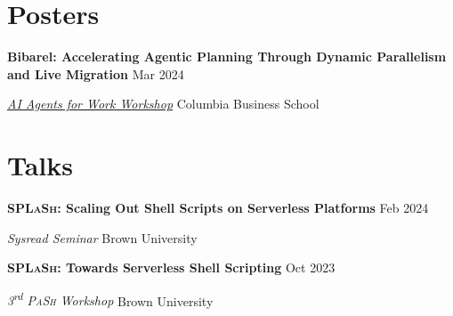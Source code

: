 \documentclass[margin,12pt]{resume}
\newcommand{\descriptionVSpace}{\vspace{0.5ex}\xspace}
\newcommand{\subsectionVSpace}{\vspace{3.5ex}\xspace}
\newcommand{\sectionVSpace}{\vspace{1ex}\xspace} %
\newcommand{\pash}{\textsc{PaSh}\xspace}
\newcommand{\sectionVSpaceCorrection}{\vspace{-3.5ex}} %
\newcommand{\splash}{\textsc{SPLaSh}\xspace}
\newcommand{\header}[1]{\textbf{#1}\xspace}
\newcommand{\competition}[1]{\header{#1}\xspace}
\newcommand{\event}[1]{\textit{#1}\xspace}
\newcommand{\ordinal}[1]{\textsuperscript{#1}\xspace}
\newcommand{\place}[1]{#1\xspace}
\newcommand{\poster}[1]{\header{#1}\xspace}
\newcommand{\singleDate}[1]{#1\xspace}
\newcommand{\talk}[1]{\header{#1}\xspace}
\newenvironment{rSubsection}{}{\par\subsectionVSpace}
\newenvironment{rSection}[1]{\sectionVSpaceCorrection\section{#1}\xspace}{\sectionVSpace\par}
\newenvironment{jobDuties}{\descriptionVSpace}{\par}
\begin{document}
\begin{resume}
\begin{rSection}{Posters}
        \begin{rSubsection}
            \poster{Bibarel: Accelerating Agentic Planning Through Dynamic Parallelism and Live Migration} \hfill Mar 2024

            \event{\href{https://daplab.cs.columbia.edu/workshop/}{AI Agents for Work Workshop}} \hfill \place{Columbia Business School}
        \end{rSubsection}
    \end{rSection}

    \begin{rSection}{Talks}


        \begin{rSubsection}
            \talk{\splash: Scaling Out Shell Scripts on Serverless Platforms} \hfill \singleDate{Feb 2024}

            \event{Sysread Seminar} \hfill \place{Brown University}
        \end{rSubsection}



        \begin{rSubsection}
            \talk{\splash: Towards Serverless Shell Scripting} \hfill \singleDate{Oct 2023}

            \event{3\ordinal{rd} \pash Workshop} \hfill \place{Brown University}
        \end{rSubsection}
    \end{rSection}




\end{resume}
\end{document}
